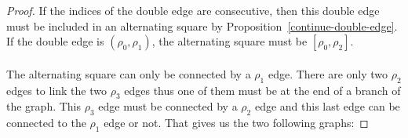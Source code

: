 \begin{proof}
  If the indices of the double edge are consecutive, then this double edge must be included in an alternating square by Proposition~\ref{continue-double-edge}. If the double edge is $(\rho_0, \rho_1)$, the alternating square must be $[\rho_0, \rho_2]$.

  \begin{figure}[H]
    \begin{center}
      \caption{}
    \end{center}
  \end{figure}

  \paragraph{}
  The alternating square can only be connected by a $\rho_1$ edge. There are only two $\rho_2$ edges to link the two $\rho_3$ edges thus one of them must be at the end of a branch of the graph. This $\rho_3$ edge must be connected by a $\rho_2$ edge and this last edge can be connected to the $\rho_1$ edge or not. That gives us the two following graphs:


\end{proof}
